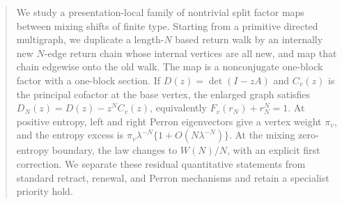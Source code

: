 \begin{abstract}
We study a presentation-local family of nontrivial split factor maps between
mixing shifts of finite type.  Starting from a primitive directed multigraph,
we duplicate a length-$N$ based return walk by an internally new $N$-edge
return chain whose internal vertices are all new, and map that chain edgewise
onto the old walk.  The map is
a nonconjugate one-block factor with a one-block section.  If
$D(z)=\det(I-zA)$ and $C_v(z)$ is the principal cofactor at the base vertex,
the enlarged graph satisfies
$D_N(z)=D(z)-z^NC_v(z)$, equivalently
$F_v(r_N)+r_N^N=1$.  At positive entropy, left and right Perron eigenvectors
give a vertex weight $\pi_v$, and the entropy excess is
$\pi_v\lambda^{-N}\{1+O(N\lambda^{-N})\}$.  At the mixing zero-entropy
boundary, the law changes to $W(N)/N$, with an explicit first correction.
We separate these residual quantitative statements from standard retract,
renewal, and Perron mechanisms and retain a specialist priority hold.
\end{abstract}
